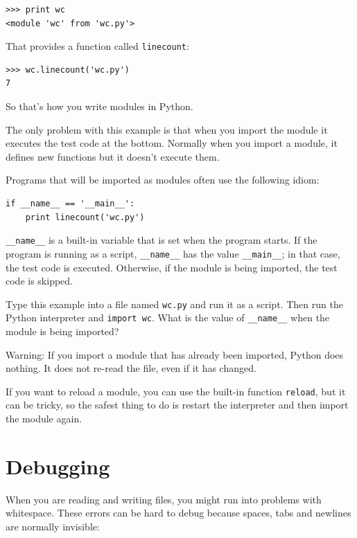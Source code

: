 \documentclass[10pt]{book}
\begin{document}
\begin{verbatim}
>>> print wc
<module 'wc' from 'wc.py'>
\end{verbatim}
%
That provides a function called \verb"linecount":

\begin{verbatim}
>>> wc.linecount('wc.py')
7
\end{verbatim}
%
So that's how you write modules in Python.

The only problem with this example is that when you import
the module it executes the test code at the bottom.  Normally
when you import a module, it defines new functions but it
doesn't execute them.

Programs that will be imported as modules often
use the following idiom:

\begin{verbatim}
if __name__ == '__main__':
    print linecount('wc.py')
\end{verbatim}
%
\verb"__name__" is a built-in variable that is set when the
program starts.  If the program is running as a script,
\verb"__name__" has the value \verb"__main__"; in that
case, the test code is executed.  Otherwise,
if the module is being imported, the test code is skipped.

\begin{exercise}

Type this example into a file named {\tt wc.py} and run
it as a script.  Then run the Python interpreter and
{\tt import wc}.  What is the value of \verb"__name__"
when the module is being imported?

Warning: If you import a module that has already been imported,
Python does nothing.  It does not re-read the file, even if it has
changed.

If you want to reload a module, you can use the built-in function 
{\tt reload}, but it can be tricky, so the safest thing to do is
restart the interpreter and then import the module again.

\end{exercise}



\section{Debugging}

When you are reading and writing files, you might run into problems
with whitespace.  These errors can be hard to debug because spaces,
tabs and newlines are normally invisible:
\end{document}
